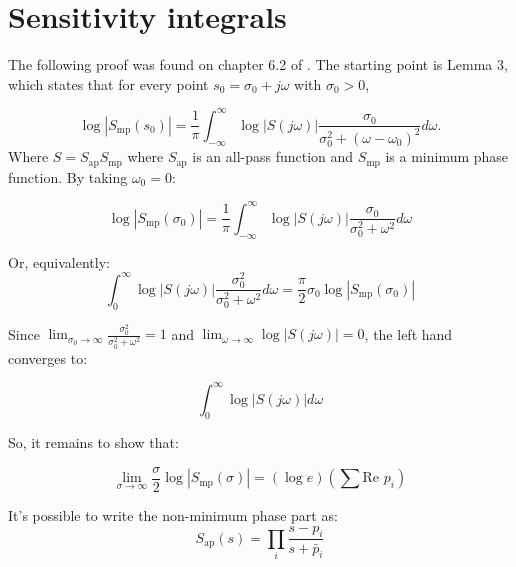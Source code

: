 \documentclass{scrreprt}
\begin{document}
\section{Sensitivity integrals}
The following proof was found on chapter 6.2 of \cite{Doy90}. The starting point is Lemma 3, which states that for every point $s_0=\sigma_0+j\omega$ with $\sigma_0>0$,

\begin{equation}
    \operatorname{log}|S_{\text{mp}}(s_0)|=\frac{1}{\pi}\int_{-\infty}^{\infty} \operatorname{log}{|S(j\omega)|}\frac{\sigma_0}{\sigma_0^2+(\omega-\omega_0)^2}d\omega.
\end{equation}
Where $S = S_\text{ap}S_\text{mp}$ where $S_\text{ap}$ is an all-pass function and $S_\text{mp}$ is a minimum phase function.
By taking $\omega_0=0$:

\begin{equation}
    \operatorname{log}|S_{\text{mp}}(\sigma_0)|=\frac{1}{\pi}\int_{-\infty}^{\infty} \operatorname{log}{|S(j\omega)|}\frac{\sigma_0}{\sigma_0^2+\omega^2}d\omega
\end{equation}

Or, equivalently:
\begin{equation}
    \int_{0}^{\infty} \operatorname{log}{|S(j\omega)|}\frac{\sigma_0^2}{\sigma_0^2+\omega^2}d\omega=\frac{\pi}{2} \sigma_0 \operatorname{log}|S_{\text{mp}}(\sigma_0)|
\end{equation}

Since $\lim_{\sigma_0\rightarrow \infty}{\frac{\sigma_0^2}{\sigma_0^2+\omega^2}}=1$ and $\lim_{\omega\rightarrow \infty}{\operatorname{log}{|S(j\omega)|}}=0$, the left hand converges to:

\begin{equation}
    \int_{0}^{\infty} \operatorname{log}{|S(j\omega)|}d\omega
\end{equation}

So, it remains to show that:

\begin{equation}
    \lim_{\sigma\rightarrow \infty}{\frac{\sigma}{2} \operatorname{log}\left|S_{\text{mp}}(\sigma)\right|}=(\operatorname{log}{e})\left(\sum\text{Re }p_i\right)
    \label{eq:claim}
\end{equation}

It's possible to write the non-minimum phase part as:
\begin{equation}
    S_\text{ap}(s) = \prod_{i}{\frac{s-p_i}{s+\bar{p}_i}}
\end{equation}
\end{document}
